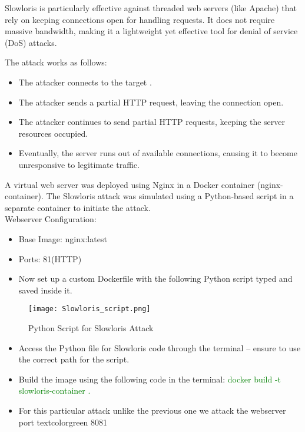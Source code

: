 \documentclass[conference]{IEEEtran}
\begin{document}
Slowloris is particularly effective against threaded web servers (like Apache) that rely on keeping connections open for handling requests. It does not require massive bandwidth, making it a lightweight yet effective tool for denial of service (DoS) attacks.

The attack works as follows:
\begin{itemize}
\item The attacker connects to the target .
\item The attacker sends a partial HTTP request, leaving the connection open.
\item The attacker continues to send partial HTTP requests, keeping the server resources occupied.
\item Eventually, the server runs out of available connections, causing it to become unresponsive to legitimate traffic.
\end{itemize}



A virtual web server was deployed using Nginx in a Docker container (nginx-container). The Slowloris attack was simulated using a Python-based script in a separate container to initiate the attack.\\

Webserver Configuration:
\begin{itemize}
\item  Base Image: nginx:latest
\item Ports: 81(HTTP)
\item Now set up a custom Dockerfile with the following Python script typed and saved inside it.
\end{itemize}

\begin{figure}[htbp]
\hspace{0.7cm} 
\centerline{\texttt{[image: Slowloris\_script.png]}}
\caption{Python Script for Slowloris Attack}
\label{fig:slowloris}
\end{figure}



\begin{itemize}
\item Access the Python file for Slowloris code through the terminal – ensure to use the correct path for the script.
\\
\item Build the image using the following code in the terminal: \textcolor{green}{docker build -t slowloris-container .}
\\
\item For this particular attack unlike the previous one we attack the webserver port textcolor{green}{ 8081}
\end{itemize}
\end{document}
